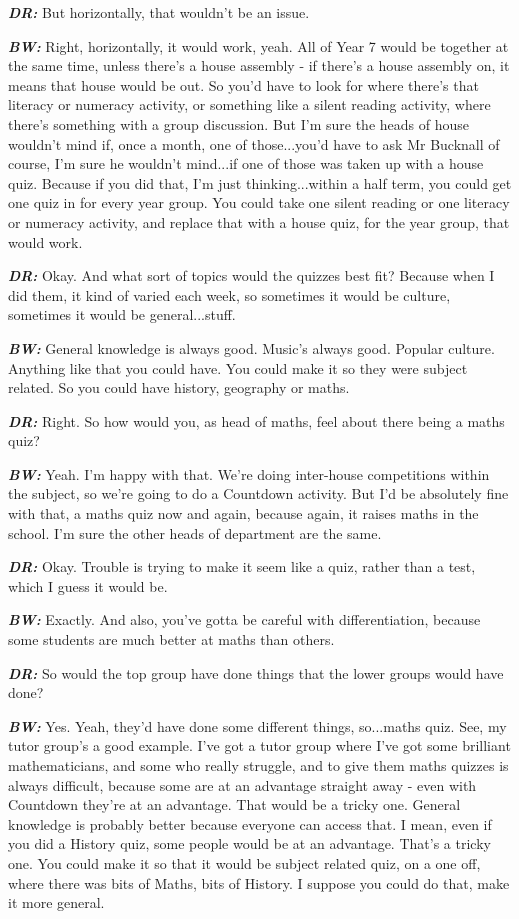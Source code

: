 \textit{\textbf{DR:}} But horizontally, that wouldn't be an issue.

\textit{\textbf{BW:}} Right, horizontally, it would work, yeah. All of Year 7 would be together at the same time, unless there's a house assembly - if there's a house assembly on, it means that house would be out. So you'd have to look for where there's that literacy or numeracy activity, or something like a silent reading activity, where there's something with a group discussion. But I'm sure the heads of house wouldn't mind if, once a month, one of those...you'd have to ask Mr Bucknall of course, I'm sure he wouldn't mind...if one of those was taken up with a house quiz. Because if you did that, I'm just thinking...within a half term, you could get one quiz in for every year group. You could take one silent reading or one literacy or numeracy activity, and replace that with a house quiz, for the year group, that would work.

\textit{\textbf{DR:}} Okay. And what sort of topics would the quizzes best fit? Because when I did them, it kind of varied each week, so sometimes it would be culture, sometimes it would be general...stuff.

\textit{\textbf{BW:}} General knowledge is always good. Music's always good. Popular culture. Anything like that you could have. You could make it so they were subject related. So you could have history, geography or maths.

\textit{\textbf{DR:}} Right. So how would you, as head of maths, feel about there being a maths quiz?

\textit{\textbf{BW:}} Yeah. I'm happy with that. We're doing inter-house competitions within the subject, so we're going to do a Countdown activity. But I'd be absolutely fine with that, a maths quiz now and again, because again, it raises maths in the school. I'm sure the other heads of department are the same.

\textit{\textbf{DR:}} Okay. Trouble is trying to make it seem like a quiz, rather than a test, which I guess it would be.

\textit{\textbf{BW:}} Exactly. And also, you've gotta be careful with differentiation, because some students are much better at maths than others.

\textit{\textbf{DR:}} So would the top group have done things that the lower groups would have done?

\textit{\textbf{BW:}} Yes. Yeah, they'd have done some different things, so...maths quiz. See, my tutor group's a good example. I've got a tutor group where I've got some brilliant mathematicians, and some who really struggle, and to give them maths quizzes is always difficult, because some are at an advantage straight away - even with Countdown they're at an advantage. That would be a tricky one. General knowledge is probably better because everyone can access that. I mean, even if you did a History quiz, some people would be at an advantage. That's a tricky one. You could make it so that it would be subject related quiz, on a one off, where there was bits of Maths, bits of History. I suppose you could do that, make it more general.

